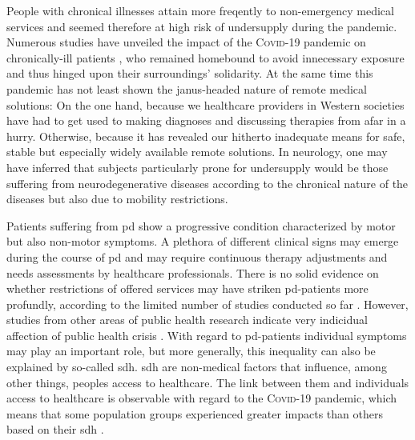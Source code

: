 \documentclass{bmcart}
\begin{document}
	People with chronical illnesses attain more freqently to non-emergency medical services and seemed therefore at high risk of undersupply during the pandemic. Numerous studies have unveiled the impact of the \textsc{Covid}-19 pandemic on chronically-ill patients \cite{olivieri2021auswirkungen, ceglaeinfluss}, who remained homebound to avoid innecessary exposure and thus hinged upon their surroundings' solidarity. At the same time this pandemic has not least shown the janus-headed nature of remote medical solutions: On the one hand, because we healthcare providers in Western societies have had to get used to making diagnoses and discussing therapies from afar in a hurry. Otherwise, because it has revealed our hitherto inadequate means for safe, stable but especially widely available remote solutions. In neurology, one may have inferred that subjects particularly prone for undersupply would be those suffering from neurodegenerative diseases according to the chronical nature of the diseases but also due to mobility restrictions. 

	Patients suffering from \ac{pd} show a progressive condition characterized by motor but also non-motor symptoms. A plethora of different clinical signs may emerge during the course of \ac{pd} and may require continuous therapy adjustments and needs assessments by healthcare professionals. There is no solid evidence on whether restrictions of offered services may have striken \ac{pd}-patients more profundly, according to the limited number of studies conducted so far \cite{zipprich2020knowledge, frundt2022impact, richter2021analysis}. However, studies from other areas of public health research indicate very indicidual affection of public health crisis \cite{huijts2017prevalence, lowcock2012social}. With regard to \ac{pd}-patients individual symptoms may play an important role, but more generally, this inequality can also be explained by so-called \ac{sdh}. \ac{sdh} are non-medical factors that influence, among other things, peoples access to healthcare. The link between them and individuals access to healthcare is observable with regard to the \textsc{Covid}-19 pandemic, which means that some population groups experienced greater impacts than others based on their \ac{sdh} \cite{whocovidbrief}.
\end{document}

